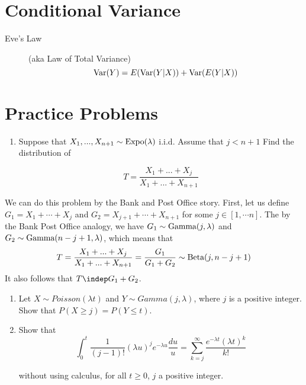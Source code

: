 \documentclass[11pt]{article}
\begin{document}
\section*{Conditional Variance}
\begin{description}
  \item[Eve's Law] (aka Law of Total Variance) \quad
  \[\textrm{Var}(Y) = E(\textrm{Var}(Y|X)) + \textrm{Var}(E(Y|X))\]
\end{description}
\pagebreak


\section*{Practice Problems}
\begin{exercise}
\begin{enumerate}
\item Suppose that $X_1,...,X_{n+1} \sim \textrm{Expo}(\lambda)$ i.i.d. Assume that $j < n + 1$ Find the distribution of

\[T = \frac{X_1+...+X_j}{X_1+...+X_{n+1}}\]
\end{enumerate}
\end{exercise}

\begin{solution}
We can do this problem by the Bank and Post Office story. First, let us define $G_1 = X_1 + \cdots + X_j$ and $G_2 = X_{j+1} + \cdots + X_{n+1}$ for some $j \in [1,\cdots n]$. The by the Bank Post Office analogy, we have $G_1 \sim \textrm{Gamma}(j,\lambda)$ and $G_2 \sim \textrm{Gamma}(n - j + 1, \lambda)$, which means that
$$
T = \frac{X_1+...+X_j}{X_1+...+X_{n+1}} = \frac{G_1}{G_1 + G_2} \sim \textrm{Beta}(j, n-j+1)
$$
It also follows that $T \indep G_1 + G_2$.
\end{solution}

\begin{exercise} 
\begin{enumerate}
\item Let $X \sim Poisson(\lambda t)$ and $Y \sim Gamma(j,\lambda)$, where $j$ is a positive integer. Show that $P(X \ge j) = P(Y \le t)$.

\item Show that
$$\int_0^t \frac{1}{(j-1)!} (\lambda u)^j e^{-\lambda u} \frac{du}{u} = \sum_{k=j}^{\infty} \frac{e^{-\lambda t}(\lambda t)^k}{k!}$$

without using calculus, for all $t \ge 0$, $j$ a positive integer.
\end{enumerate}
\end{exercise}
\end{document}
